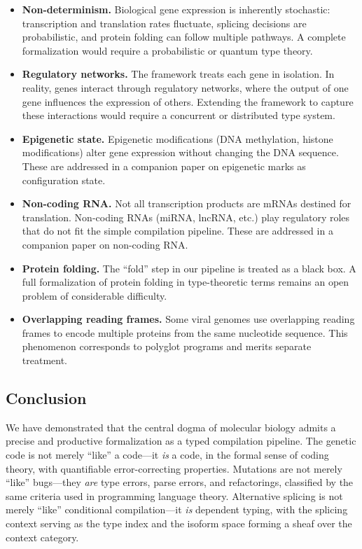\documentclass[12pt,a4paper]{article}
\theoremstyle{definition}
\begin{document}
\begin{itemize}
  \item \textbf{Non-determinism.} Biological gene expression is inherently stochastic: transcription and translation rates fluctuate, splicing decisions are probabilistic, and protein folding can follow multiple pathways. A complete formalization would require a probabilistic or quantum type theory.

  \item \textbf{Regulatory networks.} The framework treats each gene in isolation. In reality, genes interact through regulatory networks, where the output of one gene influences the expression of others. Extending the framework to capture these interactions would require a concurrent or distributed type system.

  \item \textbf{Epigenetic state.} Epigenetic modifications (DNA methylation, histone modifications) alter gene expression without changing the DNA sequence. These are addressed in a companion paper on epigenetic marks as configuration state.

  \item \textbf{Non-coding RNA.} Not all transcription products are mRNAs destined for translation. Non-coding RNAs (miRNA, lncRNA, etc.) play regulatory roles that do not fit the simple compilation pipeline. These are addressed in a companion paper on non-coding RNA.

  \item \textbf{Protein folding.} The ``fold'' step in our pipeline is treated as a black box. A full formalization of protein folding in type-theoretic terms remains an open problem of considerable difficulty.

  \item \textbf{Overlapping reading frames.} Some viral genomes use overlapping reading frames to encode multiple proteins from the same nucleotide sequence. This phenomenon corresponds to polyglot programs and merits separate treatment.
\end{itemize}

\subsection{Conclusion}

We have demonstrated that the central dogma of molecular biology admits a precise and productive formalization as a typed compilation pipeline.
The genetic code is not merely ``like'' a code---it \emph{is} a code, in the formal sense of coding theory, with quantifiable error-correcting properties.
Mutations are not merely ``like'' bugs---they \emph{are} type errors, parse errors, and refactorings, classified by the same criteria used in programming language theory.
Alternative splicing is not merely ``like'' conditional compilation---it \emph{is} dependent typing, with the splicing context serving as the type index and the isoform space forming a sheaf over the context category.
\end{document}
